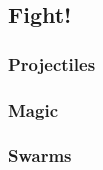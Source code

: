 \begin{multicols}{2}

\subsection*{}



\subsection*{Fight!}





\commonWeaponsChart





\subsubsection*{Projectiles}



\commonArmourChart

\subsubsection*{Magic}



\subsubsection*{Swarms}





\end{multicols}


